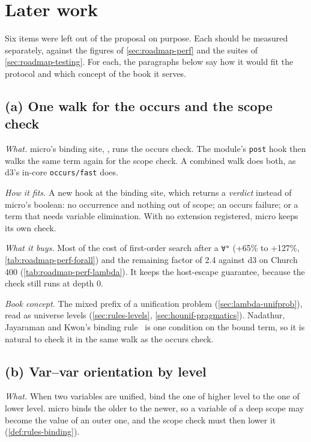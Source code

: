 \section{Later work}\label{sec:roadmap-later}

Six items were left out of the proposal on purpose. Each should be measured separately, against the
figures of \cref{sec:roadmap-perf} and the suites of \cref{sec:roadmap-testing}. For each, the paragraphs
below say how it would fit the protocol and which concept of the book it serves.

\subsection{(a) One walk for the occurs and the scope check}\label{sec:roadmap-later-walk}

\emph{What.} micro's binding site, , runs the occurs check. The module's
\texttt{post} hook then walks the same term again for the scope check. A combined walk does both, as d3's
in-core \texttt{occurs/fast} does.

\emph{How it fits.} A new hook at the binding site, which returns a \emph{verdict} instead of micro's
boolean: no occurrence and nothing out of scope; an occurs failure; or a term that needs variable
elimination. With no extension registered, micro keeps its own check.

\emph{What it buys.} Most of the cost of first-order search after a \texttt{∀°} (+65\% to +127\%,
\cref{tab:roadmap-perf-forall}) and the remaining factor of 2.4 against d3 on Church 400
(\cref{tab:roadmap-perf-lambda}). It keeps the host-escape guarantee, because the check still runs at depth 0.

\emph{Book concept.} The mixed prefix of a unification problem (\cref{sec:lambda-unifprob}), read as
universe levels (\cref{sec:rules-levels}, \cref{sec:hounif-pragmatics}). Nadathur, Jayaraman and Kwon's binding rule~\cite{NadathurJayaramanKwon1995}
is one condition on the bound term, so it is natural to check it in the same walk as the occurs check.

\subsection{(b) Var--var orientation by level}\label{sec:roadmap-later-varvar}

\emph{What.} When two variables are unified, bind the one of higher level to the one of lower level.
micro binds the older to the newer, so a variable of a deep scope may become the value of an outer one,
and the scope check must then lower it (\cref{def:rules-binding}).

